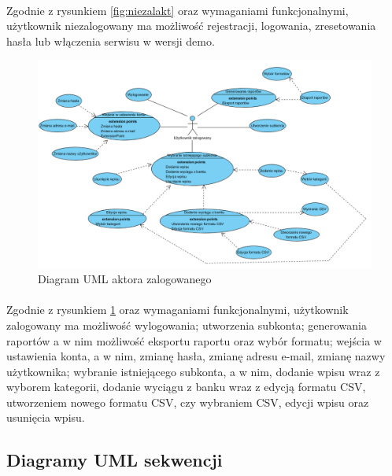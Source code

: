 \documentclass{article}
\begin{document}
	\paragraph*{} Zgodnie z rysunkiem \ref{fig:niezalakt} oraz wymaganiami funkcjonalnymi, użytkownik niezalogowany ma możliwość rejestracji, logowania, zresetowania hasła lub włączenia serwisu w wersji demo.
	\begin{figure}[H]
		\hspace*{-4cm}
		\includegraphics[scale=0.75]{assets/uml2.png}
		\caption[]{Diagram UML aktora zalogowanego}
		\label{fig:zalakt}
	\end{figure}
	\paragraph*{} Zgodnie z rysunkiem \ref{fig:zalakt} oraz wymaganiami funkcjonalnymi, użytkownik zalogowany ma możliwość wylogowania; utworzenia subkonta; generowania raportów a w nim możliwość eksportu raportu oraz wybór formatu; wejścia w ustawienia konta, a w nim, zmianę hasła, zmianę adresu e-mail, zmianę nazwy użytkownika; wybranie istniejącego subkonta, a w nim, dodanie wpisu wraz z wyborem kategorii, dodanie wyciągu z banku wraz z edycją formatu CSV, utworzeniem nowego formatu CSV, czy wybraniem CSV, edycji wpisu oraz usunięcia wpisu.
	\subsection{Diagramy UML sekwencji}
\end{document}

